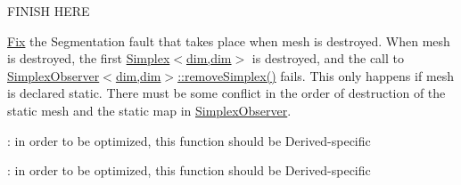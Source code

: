 
\begin{DoxyRefList}
\item[\label{todo__todo000001}%
\hypertarget{todo__todo000001}{}%
Member \hyperlink{classmodel_1_1_dislocation_segment_af269e6766aadff3f174a8ea4b724e471}{model\+:\+:Dislocation\+Segment$<$ \+\_\+dim, corder, Interpolation\+Type, q\+Order, Quadrature\+Rule $>$\+:\+:integral\+P\+K} () const ]F\+I\+N\+I\+S\+H H\+E\+R\+E  
\item[\label{todo__todo000002}%
\hypertarget{todo__todo000002}{}%
Member \hyperlink{structmodel_1_1_dislocation_shared_objects_a1ebde927216271979599e324ce29e65a}{model\+:\+:Dislocation\+Shared\+Objects$<$ Link\+Type $>$\+:\+:bdn} ]\hyperlink{structmodel_1_1_fix}{Fix} the Segmentation fault that takes place when mesh is destroyed. When mesh is destroyed, the first \hyperlink{classmodel_1_1_simplex_3_01dim_00_01dim_01_4}{Simplex$<$dim,dim$>$} is destroyed, and the call to \hyperlink{structmodel_1_1_simplex_observer_acd3b33890ad0aa0cee424cb8cc6d56fe}{Simplex\+Observer$<$dim,dim$>$\+::remove\+Simplex()} fails. This only happens if mesh is declared static. There must be some conflict in the order of destruction of the static mesh and the static map in \hyperlink{structmodel_1_1_simplex_observer}{Simplex\+Observer}.  
\item[\label{todo__todo000003}%
\hypertarget{todo__todo000003}{}%
Member \hyperlink{classmodel_1_1_trial_def_a2dc33c3a2c421b30831d0e0bfd97ce04}{model\+:\+:Trial\+Def$<$ T $>$\+:\+:operator()} (const \+\_\+\+Element\+Type \&ele, const \+\_\+\+Bary\+Type \&bary) const ]\+: in order to be optimized, this function should be Derived-\/specific  
\item[\label{todo__todo000004}%
\hypertarget{todo__todo000004}{}%
Member \hyperlink{classmodel_1_1_trial_grad_ae55d665cc1cfffd222c2abdd04d4b502}{model\+:\+:Trial\+Grad$<$ T $>$\+:\+:operator()} (const \+\_\+\+Element\+Type \&ele, const \+\_\+\+Bary\+Type \&bary) const ]\+: in order to be optimized, this function should be Derived-\/specific 
\end{DoxyRefList}